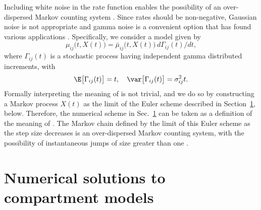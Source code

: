 Including white noise in the rate function enables the possibility of an over-dispersed Markov counting system \citep{breto11,breto09,he10}.
Since rates should be non-negative, Gaussian noise is not appropriate and gamma noise is a convenient option that has found various applications \citep{romero-severson15, subramanian20}.
Specifically, we consider a model given by
\begin{equation}
\label{eq:odmcs1}
\mu_{ij}\big(t,X(t)\big) = \bar\mu_{ij}\big(t,X(t)\big) \, d\Gamma_{ij}(t)/dt,
\end{equation}
where $\Gamma_{ij}(t)$ is a stochastic process having independent gamma distributed increments, with
\begin{equation}
\label{eq:odmcs2}
\E\big[\Gamma_{ij}(t)\big] = t, \quad \var\big[\Gamma_{ij}(t)\big] = \sigma_{ij}^2 t.
\end{equation}
Formally interpreting the meaning of  is not trivial, and we do so by constructing a Markov process $X(t)$ as the limit of the Euler scheme described in Section~\ref{sec:numerics}, below.
Therefore, the numerical scheme in Sec.~\ref{sec:numerics} can be taken as a definition of the meaning of .
The Markov chain defined by the limit of this Euler scheme as the step size decreases is an over-dispersed Markov counting system, with the possibility of instantaneous jumps of size greater than one \citep{breto11}.

\section{Numerical solutions to compartment models}
\label{sec:numerics}


